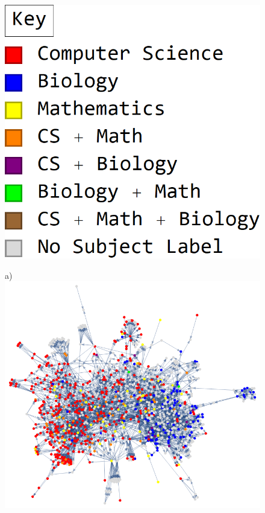 \documentclass[12pt]{thesis}
\theoremstyle{plain}
\theoremstyle{definition}
\theoremstyle{remark}
\begin{document}
\begin{figure}[p]
\centering
\begin{minipage}[c]{0.23\textwidth}
\includegraphics[width=\textwidth]{color_key.png}
\end{minipage}
\hfill
\begin{minipage}[c]{0.7\textwidth}
a)\includegraphics[width=\textwidth]{color_coded_full.png}

\end{minipage}
\end{figure}
\end{document}

